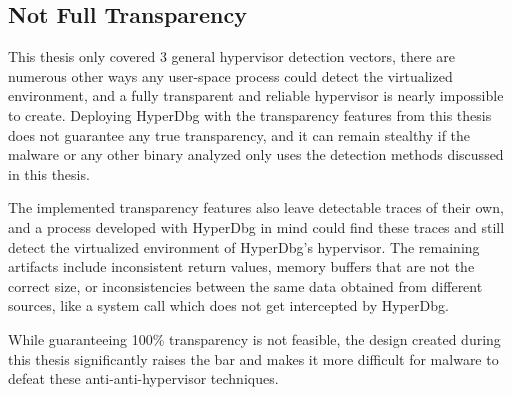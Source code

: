 \subsection{Not Full Transparency}
This thesis only covered 3 general hypervisor detection vectors, there are numerous other ways any user-space process could detect the virtualized environment, 
and a fully transparent and reliable hypervisor is nearly impossible to create. Deploying HyperDbg with the transparency features from this thesis does not guarantee any true 
transparency, and it can remain stealthy if the malware or any other binary analyzed only uses the detection methods discussed in this thesis.

The implemented transparency features also leave detectable traces of their own, and a process developed with HyperDbg in mind could find these 
traces and still detect the virtualized environment of HyperDbg's hypervisor. The remaining artifacts include inconsistent return values, memory buffers 
that are not the correct size, or inconsistencies between the same data obtained from different sources, like a system call which does not get intercepted by HyperDbg.

While guaranteeing 100\% transparency is not feasible, the design created during this thesis significantly raises the bar and makes it more difficult for malware to defeat these anti-anti-hypervisor techniques.



